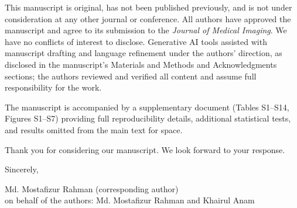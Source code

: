 \documentclass[12pt,letterpaper]{article}
\begin{document}
\medskip
\noindent This manuscript is original, has not been published previously, and is not under consideration at any other journal or conference. All authors have approved the manuscript and agree to its submission to the \textit{Journal of Medical Imaging}. We have no conflicts of interest to disclose. Generative AI tools assisted with manuscript drafting and language refinement under the authors' direction, as disclosed in the manuscript's Materials and Methods and Acknowledgments sections; the authors reviewed and verified all content and assume full responsibility for the work.

\medskip
\noindent The manuscript is accompanied by a supplementary document (Tables S1--S14, Figures S1--S7) providing full reproducibility details, additional statistical tests, and results omitted from the main text for space.

\medskip
\noindent Thank you for considering our manuscript. We look forward to your response.

\bigskip
\noindent Sincerely,

\bigskip
\noindent Md. Mostafizur Rahman (corresponding author)\\
on behalf of the authors: Md. Mostafizur Rahman and Khairul Anam
\end{document}

